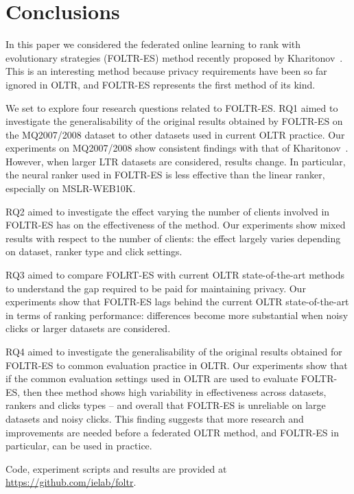 \section{Conclusions}

In this paper we considered the federated online learning to rank with evolutionary strategies (FOLTR-ES) method recently proposed by Kharitonov~\cite{kharitonov2019federated}. This is an interesting method because privacy requirements have been so far ignored in OLTR, and FOLTR-ES represents the first method of its kind. 

We set to explore four research questions related to FOLTR-ES. RQ1 aimed to investigate the generalisability of the original results obtained by FOLTR-ES on the MQ2007/2008 dataset to other datasets used in current OLTR practice. Our  experiments on MQ2007/2008 show consistent findings with that of Kharitonov~\cite{kharitonov2019federated}. However, when larger LTR datasets are considered, results change. In particular, the neural ranker used in FOLTR-ES is less effective than the linear ranker, especially on MSLR-WEB10K. %

RQ2 aimed to investigate the effect varying the number of clients involved in FOLTR-ES has on the effectiveness of the method. %
Our experiments show mixed results with respect to the number of clients: the effect largely varies depending on dataset, ranker type and click settings. 

RQ3 aimed to compare FOLRT-ES with current OLTR state-of-the-art methods to understand the gap required to be paid for maintaining privacy. Our experiments show that FOLTR-ES lags behind the current OLTR state-of-the-art in terms of ranking performance: differences become more substantial when noisy clicks or larger datasets are considered. 

RQ4 aimed to investigate the generalisability of the original results obtained for FOLTR-ES to common evaluation practice in OLTR. Our experiments show that if the common evaluation settings used in OLTR are used to evaluate FOLTR-ES, then thee method shows high variability in effectiveness across datasets, rankers and clicks types -- and overall that FOLTR-ES is unreliable on large datasets and noisy clicks. This finding suggests that more research and improvements are needed before a federated OLTR method, and FOLTR-ES in particular, can be used in practice. 

Code, experiment scripts and results are provided at \url{https://github.com/ielab/foltr}. 

